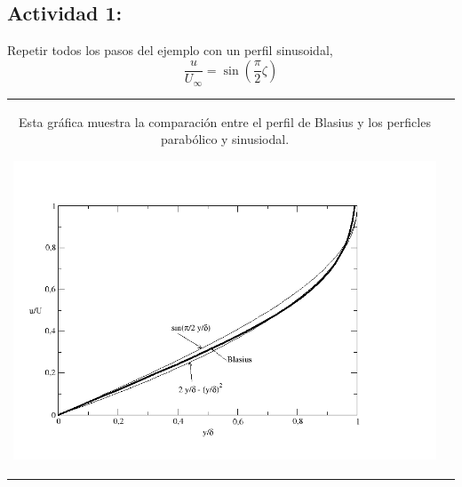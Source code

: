 	
	\subsection*{Actividad 1:}
		Repetir todos los pasos del ejemplo con un perfil sinusoidal, 
		\[
		\frac{u}{U_{\infty}}=\sin\left(\frac{\pi}{2}\zeta\right)
		\]

	
	
	\begin{tabular}{cc}
		\begin{minipage}[c]{0.75\textwidth}%
			Esta gráfica muestra la comparación entre el perfil de Blasius y los perficles parabólico y sinusiodal.
			\begin{center}
				\includegraphics[width=1\linewidth]{TeX_files/chapter08-CapaLimite/Figures/perfilesLaminar}
			\end{center}
			

\end{minipage}
\end{tabular}

